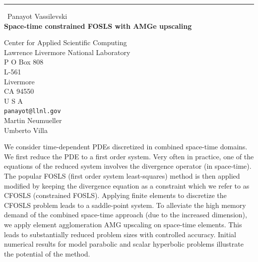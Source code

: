 \documentclass{report}
\begin{document}
\begin{center}
\rule{6in}{1pt} \
{\large Panayot Vassilevski \\
{\bf Space-time constrained FOSLS with AMGe upscaling}}

Center for Applied Scientific Computing \\ Lawrence Livermore National Laboratory \\ P O Box 808 \\ L-561 \\ Livermore \\ CA 94550 \\ U S A
\\
{\tt panayot@llnl.gov}\\
Martin Neumueller\\
Umberto Villa\end{center}

We consider time-dependent PDEs discretized in combined space-time
domains. We first reduce the PDE to a first order system. Very often in
practice, one of the equations of the reduced system involves the
divergence operator (in space-time).
The popular FOSLS (first order system least-squares) method is then
applied modified by keeping the divergence equation as a constraint which
we refer to as CFOSLS (constrained FOSLS). Applying finite elements to
discretize the CFOSLS problem leads to a saddle-point system. To
alleviate the high memory demand of the combined space-time approach (due
to the increased dimension),
we apply element agglomeration AMG upscaling on space-time elements. This
leads to substantially reduced problem sizes with controlled accuracy.
Initial numerical results for model parabolic and scalar hyperbolic
problems illustrate the potential of the method.
\end{document}
